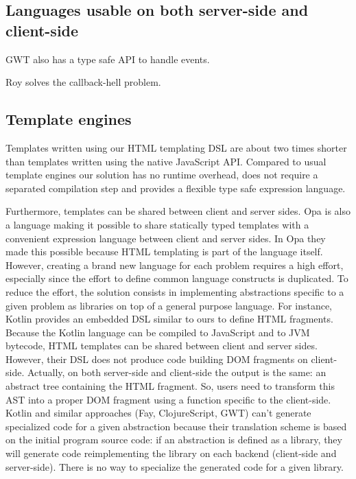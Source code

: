 \documentclass[american,english,runningheads]{llncs}
\begin{document}
\subsection{Languages usable on both server-side and client-side}

GWT also has a type safe API to handle events.

Roy solves the callback-hell problem.

\subsection{Template engines}

Templates written using our HTML templating DSL are about two times shorter than templates written using the native
JavaScript API. Compared to usual template engines our solution has no runtime overhead, does not require a separated
compilation step and provides a flexible type safe expression language.

Furthermore, templates can be shared between client and server sides. Opa is also a language making it possible to
share statically typed templates with a convenient expression language between client and server sides. In Opa they
made this possible because HTML templating is part of the language itself. However, creating a brand new language for
each problem requires a high effort, especially since the effort to define common language constructs is duplicated.
To reduce the effort, the solution consists in implementing abstractions specific to a given problem as libraries on
top of a general purpose language. For instance, Kotlin provides an embedded DSL similar to ours to define HTML
fragments. Because the Kotlin language can be compiled to JavaScript and to JVM bytecode, HTML templates can be
shared between client and server sides. However, their DSL does not produce code building DOM fragments on
client-side. Actually, on both server-side and client-side the output is the same: an abstract tree containing the
HTML fragment. So, users need to transform this AST into a proper DOM fragment using a function specific to the
client-side. Kotlin and similar approaches (Fay, ClojureScript, GWT) can’t generate specialized code for a given
abstraction because their translation scheme is based on the initial program source code: if an abstraction is
defined as a library, they will generate code reimplementing the library on each backend (client-side and
server-side). There is no way to specialize the generated code for a given library.
\end{document}
